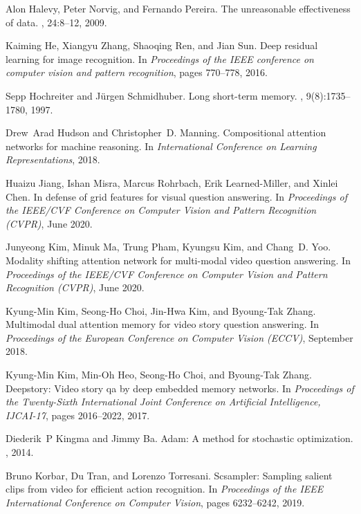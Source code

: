 \documentclass[final]{cvpr}
\begin{document}
{\begin{thebibliography}{10}
Alon Halevy, Peter Norvig, and Fernando Pereira.
\newblock The unreasonable effectiveness of data.
, 24:8--12, 2009.

Kaiming He, Xiangyu Zhang, Shaoqing Ren, and Jian Sun.
\newblock Deep residual learning for image recognition.
\newblock In {\em Proceedings of the IEEE conference on computer vision and
  pattern recognition}, pages 770--778, 2016.

Sepp Hochreiter and J{\"u}rgen Schmidhuber.
\newblock Long short-term memory.
, 9(8):1735--1780, 1997.

Drew~Arad Hudson and Christopher~D. Manning.
\newblock Compositional attention networks for machine reasoning.
\newblock In {\em International Conference on Learning Representations}, 2018.

Huaizu Jiang, Ishan Misra, Marcus Rohrbach, Erik Learned-Miller, and Xinlei
  Chen.
\newblock In defense of grid features for visual question answering.
\newblock In {\em Proceedings of the IEEE/CVF Conference on Computer Vision and
  Pattern Recognition (CVPR)}, June 2020.

Junyeong Kim, Minuk Ma, Trung Pham, Kyungsu Kim, and Chang~D. Yoo.
\newblock Modality shifting attention network for multi-modal video question
  answering.
\newblock In {\em Proceedings of the IEEE/CVF Conference on Computer Vision and
  Pattern Recognition (CVPR)}, June 2020.

Kyung-Min Kim, Seong-Ho Choi, Jin-Hwa Kim, and Byoung-Tak Zhang.
\newblock Multimodal dual attention memory for video story question answering.
\newblock In {\em Proceedings of the European Conference on Computer Vision
  (ECCV)}, September 2018.

Kyung-Min Kim, Min-Oh Heo, Seong-Ho Choi, and Byoung-Tak Zhang.
\newblock Deepstory: Video story qa by deep embedded memory networks.
\newblock In {\em Proceedings of the Twenty-Sixth International Joint
  Conference on Artificial Intelligence, {IJCAI-17}}, pages 2016--2022, 2017.

Diederik~P Kingma and Jimmy Ba.
\newblock Adam: A method for stochastic optimization.
, 2014.

Bruno Korbar, Du Tran, and Lorenzo Torresani.
\newblock Scsampler: Sampling salient clips from video for efficient action
  recognition.
\newblock In {\em Proceedings of the IEEE International Conference on Computer
  Vision}, pages 6232--6242, 2019.


\end{thebibliography}}
\end{document}
